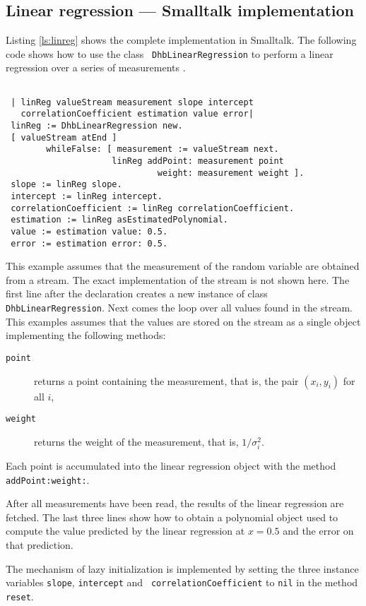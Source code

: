 \documentclass[twoside]{book}
\begin{document}
\subsection{Linear regression --- Smalltalk  implementation}
Listing \ref{ls:linreg} shows the complete implementation in
Smalltalk. The following code shows how to use the class {\tt
DhbLinearRegression} to perform a linear regression over a series
of measurements .
\begin{codeExample}
\begin{verbatim}

 | linReg valueStream measurement slope intercept
   correlationCoefficient estimation value error|
 linReg := DhbLinearRegression new.
 [ valueStream atEnd ]
        whileFalse: [ measurement := valueStream next.
                     linReg addPoint: measurement point
                              weight: measurement weight ].
 slope := linReg slope.
 intercept := linReg intercept.
 correlationCoefficient := linReg correlationCoefficient.
 estimation := linReg asEstimatedPolynomial.
 value := estimation value: 0.5.
 error := estimation error: 0.5.
\end{verbatim}
\end{codeExample}
This example assumes that the measurement of the random variable
are obtained from a stream. The exact implementation of the stream
is not shown here. The first line after the declaration creates a
new instance of class {\tt DhbLinearRegression}. Next comes the
loop over all values found in the stream. This examples assumes
that the values are stored on the stream as a single object
implementing the following methods:
\begin{description}
  \item[\tt point] returns a point containing the measurement,
  that is, the pair $\left(x_i,y_i\right)$ for all $i$,
  \item[\tt weight] returns the weight of the measurement, that
  is, $1/\sigma^2_i$.
\end{description}
\noindent Each point is accumulated into the linear regression
object with the method {\tt addPoint:weight:}.

After all measurements have been read, the results of the linear
regression are fetched. The last three lines show how to obtain a
polynomial object used to compute the value predicted by the
linear regression at $x=0.5$ and the error on that prediction.

The mechanism of lazy initialization is implemented by setting the
three instance variables {\tt slope}, {\tt intercept} and {\tt
correlationCoefficient} to {\tt nil} in the method {\tt reset}.
\end{document}
